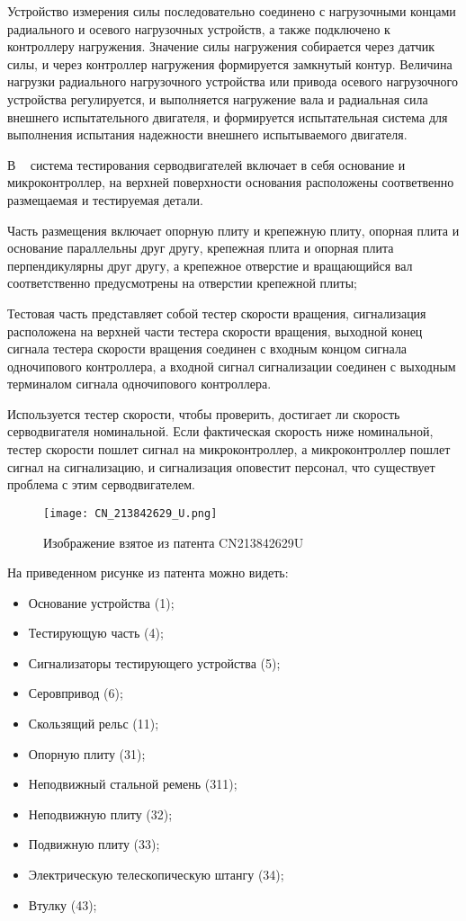 Устройство измерения силы последовательно соединено с нагрузочными
концами радиального и осевого нагрузочных устройств, а также
подключено к контроллеру нагружения. Значение силы нагружения
собирается через датчик силы, и через контроллер нагружения
формируется замкнутый контур. Величина нагрузки радиального
нагрузочного устройства или привода осевого нагрузочного устройства
регулируется, и выполняется нагружение вала и радиальная сила внешнего
испытательного двигателя, и формируется испытательная система для
выполнения испытания надежности внешнего испытываемого двигателя.


В ~\cite{CN213842629U} система тестирования серводвигателей включает в себя
основание и микроконтроллер, на верхней поверхности основания расположены
соответвенно размещаемая и тестируемая детали.

Часть размещения включает опорную плиту и крепежную плиту, опорная
плита и основание параллельны друг другу, крепежная плита и опорная
плита перпендикулярны друг другу, а крепежное отверстие и вращающийся
вал соответственно предусмотрены на отверстии крепежной плиты;

Тестовая часть представляет собой тестер скорости вращения,
сигнализация расположена на верхней части тестера скорости вращения,
выходной конец сигнала тестера скорости вращения соединен с входным
концом сигнала одночипового контроллера, а входной сигнал сигнализации
соединен с выходным терминалом сигнала одночипового контроллера.

Используется тестер скорости, чтобы проверить, достигает ли скорость
серводвигателя номинальной. Если фактическая скорость ниже
номинальной, тестер скорости пошлет сигнал на микроконтроллер, а
микроконтроллер пошлет сигнал на сигнализацию, и сигнализация
оповестит персонал, что существует проблема с этим серводвигателем.

\begin{figure}[H]
  \centering
  \texttt{[image: CN\_213842629\_U.png]}
  \caption{Изображение взятое из патента CN213842629U}
\end{figure}

На приведенном рисунке из патента можно видеть:
\begin{itemize}
\item Основание устройства (1);
\item Тестирующую часть (4);  
\item Сигнализаторы тестирующего устройства (5);
\item Серовпривод (6);
\item Скользящий рельс (11); 
\item Опорную плиту (31);
\item Неподвижный стальной ремень (311);  
\item Неподвижную плиту (32);
\item Подвижную плиту (33);  
\item Электрическую телескопическую штангу (34);
\item Втулку (43);
\end{itemize}

